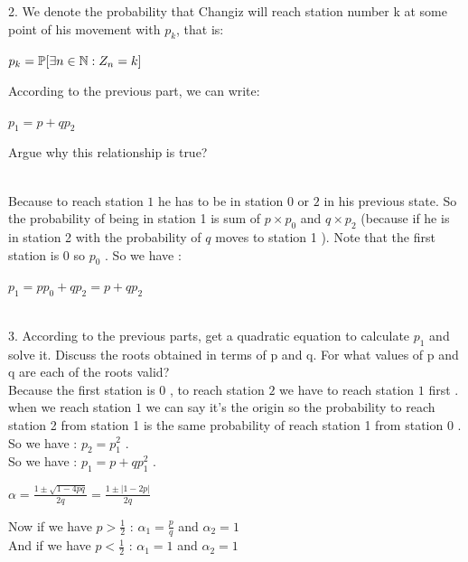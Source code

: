 \documentclass[30pt]{article}
\begin{document}
{\color{blue} {\large 2. }We denote the probability that Changiz will reach station number k at some point of his movement with $p_k$, that is: 
\begin{center}
    $p_k = \Bbb{P}[\exists n \in \Bbb{N} : Z_n = k ] $
\end{center} According to the previous part, we can write: 
\begin{center}
    $p_1 = p + qp_2$
\end{center} Argue why this relationship is true? } \\ \newline 
Because to reach station $1$ he has to be in station $0$ or $2$ in his previous state. So the probability of being in station 1 is sum of $p \times p_0 $ and $q \times p_2 $ (because if he is in station 2 with the probability of $q$ moves to station 1 ). Note that the first station is 0 so $p_0$ . So we have : \\
\begin{center}
    $p_1 = pp_0 + qp_2 = p + qp_2 $
\end{center} \\

{\color{blue} {\large 3. }According to the previous parts, get a quadratic equation to calculate $p_1$ and solve it. Discuss the roots obtained in terms of p and q. For what values of p and q are each of the roots valid? } \\ \newline 
Because the first station is $0$ , to reach station $2$ we have to reach station $1$ first . when we reach station $1$ we can say it's the origin so the probability to reach station 2 from station 1 is the same probability of reach station 1 from station 0 . So we have : $p_2 = p_1^2 $ . \\ 
So we have : \hspace{0.2cm} $p_1 = p + qp_1^2 $ . \\
\begin{center}
    $\alpha = \frac{1 \pm \sqrt{1 - 4pq}}{2q} = \frac{1 \pm |1 - 2p|}{2q} $ \\  
\end{center} 
Now if we have $ p > \frac{1}{2} $ : \hspace{0.2cm} $\alpha_1 = \frac{p}{q} $ \hspace{0.05cm} and \hspace{0.05cm}  $\alpha_2 = 1 $ \\
And if we have $ p < \frac{1}{2} $ : \hspace{0.2cm} $\alpha_1 = 1 $ \hspace{0.05cm} and \hspace{0.05cm}  $\alpha_2 = 1 $ \\
\end{document}
